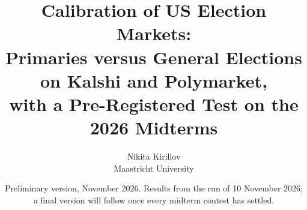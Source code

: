 \documentclass[11pt,a4paper]{article}
\title{Calibration of US Election Markets:\\
\large Primaries versus General Elections on Kalshi and Polymarket,\\
with a Pre-Registered Test on the 2026 Midterms}
\author{Nikita Kirillov\\Maastricht University}
\date{Preliminary version, November 2026. Results from the run of 10 November 2026; \\
a final version will follow once every midterm contest has settled.}
\begin{document}
\maketitle

\begin{abstract}

\end{abstract}














\end{document}
